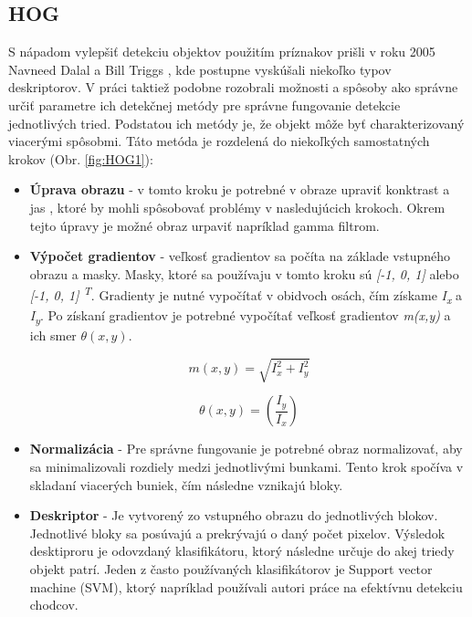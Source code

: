 \documentclass[slovak,master,dept460,male,cpp,cpdeclaration]{diploma}
\begin{document}
\subsection{HOG}
\label{HOG}
S nápadom  vylepšiť detekciu objektov použitím príznakov prišli v roku 2005 Navneed Dalal a Bill Triggs \cite{dalal2005}, kde postupne vyskúšali niekoľko typov deskriptorov.  V práci taktiež podobne rozobrali  možnosti a spôsoby ako správne určiť parametre ich detekčnej metódy pre správne fungovanie detekcie jednotlivých tried. Podstatou ich metódy je, že objekt môže byť  charakterizovaný  viacerými spôsobmi. Táto metóda je rozdelená do niekoľkých samostatných krokov (Obr. \ref{fig:HOG1}):
\begin{itemize}
  \item \textbf{Úprava obrazu} - v tomto kroku je potrebné  v obraze upraviť konktrast a jas , ktoré by mohli spôsobovať  problémy v nasledujúcich krokoch. Okrem tejto úpravy  je možné  obraz urpaviť napríklad gamma filtrom.
  \item \textbf{Výpočet gradientov} - veľkosť gradientov sa počíta na základe vstupného obrazu a masky. Masky, ktoré sa používaju v tomto kroku sú \textit{[-1, 0, 1]} alebo \textit{[-1, 0, 1] \textsuperscript{T}}. Gradienty je nutné vypočítať v obidvoch osách, čím získame \textit{I\textsubscript{x}} a \textit{I\textsubscript{y}}. Po získaní gradientov je potrebné vypočítať veľkosť gradientov \textit{m(x,y)} a ich smer \textit{$\theta(x, y)$}.
  
  \begin{equation}
m(x,y)= \sqrt{I_{x}^{2} + I_{y}^{2}}
\label{eq:Výpočet veľkosti gradientu}
\end{equation}

  \begin{equation}
\theta(x, y) = \left(\frac{I_{y}}{I_{x}}\right)
\label{eq:Výpočet smeru gradientu}
\end{equation}
  \item \textbf{Normalizácia} -  Pre správne fungovanie je potrebné obraz normalizovať, aby sa minimalizovali rozdiely medzi jednotlivými bunkami. Tento krok spočíva v skladaní viacerých buniek, čím následne vznikajú bloky. 
   \item \textbf{Deskriptor} -  Je vytvorený zo vstupného obrazu do jednotlivých blokov. Jednotlivé bloky sa posúvajú a prekrývajú o daný počet pixelov. Výsledok desktiproru je odovzdaný  klasifikátoru, ktorý následne určuje do akej triedy objekt patrí. Jeden z často používaných klasifikátorov je Support vector machine (SVM), ktorý napríklad používali autori práce na efektívnu detekciu chodcov.\cite{pang2011efficient}
 \end{itemize}
\end{document}
